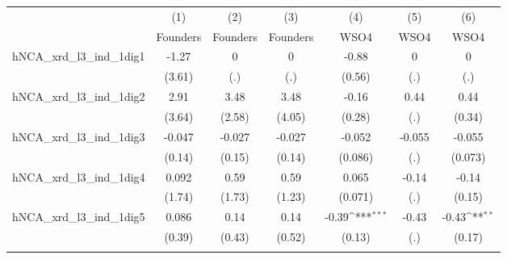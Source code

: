 {
\def\sym#1{\ifmmode^{#1}\else\(^{#1}\)\fi}
\begin{tabular}{l*{6}{c}}
\toprule
                    &\multicolumn{1}{c}{(1)}&\multicolumn{1}{c}{(2)}&\multicolumn{1}{c}{(3)}&\multicolumn{1}{c}{(4)}&\multicolumn{1}{c}{(5)}&\multicolumn{1}{c}{(6)}\\
                    &\multicolumn{1}{c}{Founders}&\multicolumn{1}{c}{Founders}&\multicolumn{1}{c}{Founders}&\multicolumn{1}{c}{WSO4}&\multicolumn{1}{c}{WSO4}&\multicolumn{1}{c}{WSO4}\\
\midrule
hNCA\_xrd\_l3\_ind\_1dig1&       -1.27         &           0         &           0         &       -0.88         &           0         &           0         \\
                    &      (3.61)         &         (.)         &         (.)         &      (0.56)         &         (.)         &         (.)         \\
\addlinespace
hNCA\_xrd\_l3\_ind\_1dig2&        2.91         &        3.48         &        3.48         &       -0.16         &        0.44         &        0.44         \\
                    &      (3.64)         &      (2.58)         &      (4.05)         &      (0.28)         &         (.)         &      (0.34)         \\
\addlinespace
hNCA\_xrd\_l3\_ind\_1dig3&      -0.047         &      -0.027         &      -0.027         &      -0.052         &      -0.055         &      -0.055         \\
                    &      (0.14)         &      (0.15)         &      (0.14)         &     (0.086)         &         (.)         &     (0.073)         \\
\addlinespace
hNCA\_xrd\_l3\_ind\_1dig4&       0.092         &        0.59         &        0.59         &       0.065         &       -0.14         &       -0.14         \\
                    &      (1.74)         &      (1.73)         &      (1.23)         &     (0.071)         &         (.)         &      (0.15)         \\
\addlinespace
hNCA\_xrd\_l3\_ind\_1dig5&       0.086         &        0.14         &        0.14         &       -0.39\sym{***}&       -0.43         &       -0.43\sym{**} \\
                    &      (0.39)         &      (0.43)         &      (0.52)         &      (0.13)         &         (.)         &      (0.17)         \\
\addlinespace

\end{tabular}}
